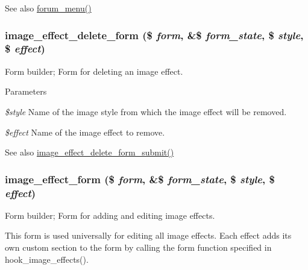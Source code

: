 \begin{DoxySeeAlso}{See also}
\hyperlink{forum_8module_a0421197a60856c7ee2cf2511f0d54ffc}{forum\_\-menu()} 
\end{DoxySeeAlso}
\hypertarget{group__forms_ga25884137c6384012e7a7d6cdde5d8afa}{
\subsubsection[{image\_\-effect\_\-delete\_\-form}]{\setlength{\rightskip}{0pt plus 5cm}image\_\-effect\_\-delete\_\-form (\$ {\em form}, \/  \&\$ {\em form\_\-state}, \/  \$ {\em style}, \/  \$ {\em effect})}}
\label{group__forms_ga25884137c6384012e7a7d6cdde5d8afa}
Form builder; Form for deleting an image effect.


\begin{DoxyParams}{Parameters}
\item[{\em \$style}]Name of the image style from which the image effect will be removed. \item[{\em \$effect}]Name of the image effect to remove.\end{DoxyParams}
\begin{DoxySeeAlso}{See also}
\hyperlink{image_8admin_8inc_aa77e4be504f72cab81b144a57a377427}{image\_\-effect\_\-delete\_\-form\_\-submit()} 
\end{DoxySeeAlso}
\hypertarget{group__forms_ga0e5c2f6d235007423202fcae209b311b}{
\subsubsection[{image\_\-effect\_\-form}]{\setlength{\rightskip}{0pt plus 5cm}image\_\-effect\_\-form (\$ {\em form}, \/  \&\$ {\em form\_\-state}, \/  \$ {\em style}, \/  \$ {\em effect})}}
\label{group__forms_ga0e5c2f6d235007423202fcae209b311b}
Form builder; Form for adding and editing image effects.

This form is used universally for editing all image effects. Each effect adds its own custom section to the form by calling the form function specified in hook\_\-image\_\-effects().


